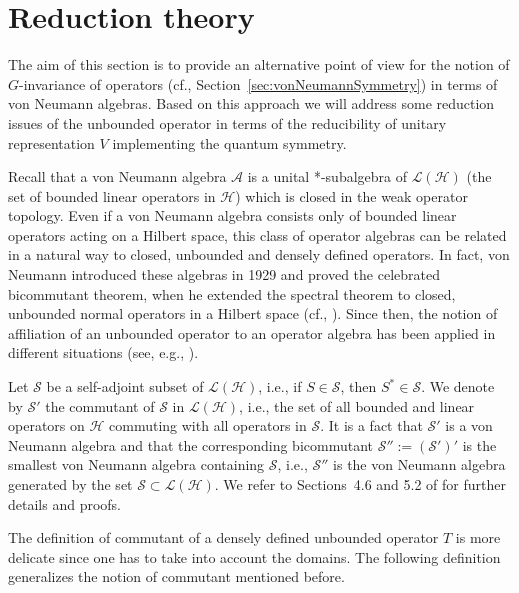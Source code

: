 \documentclass[a4paper,12pt]{amsart}
\newcommand{\A}{\mathcal{A}}
\renewcommand{\H}{\mathcal{H}}
\newcommand{\1}{\mathbb{I}}
\numberwithin{equation}{section}
\numberwithin{theorem}{section}
\begin{document}
\section{Reduction theory}\label{sec:reduction}

The aim of this section is to provide an alternative point of view for the notion of $G$-invariance of operators
(cf., Section~\ref{sec:vonNeumannSymmetry}) in terms of von Neumann algebras. Based on this approach we will
address some reduction issues of the unbounded operator in terms of the reducibility of unitary representation $V$
implementing the quantum symmetry.

Recall that a von Neumann algebra $\A$ is a unital *-subalgebra of $\mathcal{L}(\H)$
(the set of bounded linear operators in $\H$) which is closed in the weak operator topology.
Even if a von Neumann algebra consists only of bounded linear operators acting on a
Hilbert space, this class of operator algebras can be related in a natural way to closed, unbounded and densely defined
operators. In fact, von Neumann introduced these algebras in 1929 and proved the celebrated bicommutant theorem,
when he extended the spectral theorem to closed, unbounded normal operators in a
Hilbert space (cf., \cite{vNeumann29}). Since then, the 
notion of affiliation of an unbounded operator to an operator algebra has been applied in different situations
(see, e.g., \cite{Woronowicz91,Woronowicz92,BY90}).

Let $\mathcal{S}$ be a self-adjoint subset of
$\mathcal{L}(\H)$, i.e., if $S\in\mathcal{S}$, then $S^*\in\mathcal{S}$. 
We denote by $\mathcal{S}'$ the commutant of $\mathcal{S}$
in $\mathcal{L}(\H)$, i.e., the set of all bounded and linear operators on
$\H$ commuting with all operators in $\mathcal{S}$. It is a fact that
$\mathcal{S}'$ is a von Neumann algebra and that the corresponding
bicommutant $\mathcal{S}'':=(\mathcal{S}')'$ is the smallest von Neumann algebra
containing $\mathcal{S}$, i.e., $\mathcal{S}''$ is the von Neumann algebra generated by
the set $\mathcal{S}\subset\mathcal{L}(\H)$. We refer to Sections~4.6 and 5.2 of
\cite{Pedersen89} for further details and proofs.

The definition of commutant of a densely defined unbounded operator $T$ is more delicate since
one has to take into account the domains. The following definition generalizes the notion of commutant
mentioned before.
\end{document}

